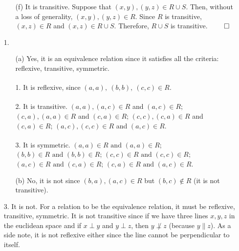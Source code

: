 \documentclass[12pt, a4paper]{article}
\newcommand\und[1]{\underline{\smash{#1}}}
\begin{document}
\begin{itemize}
\begin{itemize}
\item[]

\item[(f)]
It is transitive. Suppose that $(x, y), (y, z) \in R \cup S$. Then, without a loss of generality, $(x, y), (y, z) \in R$.
Since $R$ is transitive, $(x, z) \in R$ and $(x, z) \in R \cup S$. Therefore, $R \cup S$ is transitive.
$\qed$
\end{itemize}

\item[]
\item[]
\item[]

{\Large \textbf{\und{4.4}}}

\item[]

\item[1.]
\begin{itemize}
\item[(a)]
Yes, it is an equivalence relation since it satisfies all the criteria: reflexive, transitive, symmetric.\\\\
1. It is reflexive, since $(a, a), \ (b, b), \ (c, c) \in R$.\\\\
2. It is transitive. $(a, a), (a,c) \in R$ and $(a, c) \in R$; $(c, a), (a, a) \in R$ and $(c, a) \in R$;
$(c, c), (c, a) \in R$ and $(c, a) \in R$; $(a, c), (c, c) \in R$ and $(a, c) \in R$.\\\\
3. It is symmetric. $(a, a) \in R \mbox{ and } (a, a) \in R$; $(b, b) \in R \mbox{ and } (b, b) \in R$;
$(c, c) \in R \mbox{ and } (c, c) \in R$; $(a, c) \in R \mbox{ and } (c, a) \in R$; $(c, a) \in R \mbox{ and } (a, c) \in R$.

\item[]

\item[(b)]
No, it is not since $(b, a), (a, c) \in R$ but $(b, c) \notin R$ (it is not transitive).
\end{itemize}

\item[]
\item[]

\item[3.]
It is not. For a relation to be the equivalence relation, it must be reflexive, transitive, symmetric.
It is not transitive since if we have three lines $x, y, z$ in the euclidean space and if $x \perp y$ and $y \perp z$,
then $y \not\perp z$ (because $y \parallel z$). As a side note, it is not reflexive either since the line cannot be perpendicular to itself.


\end{itemize}
\end{document}
